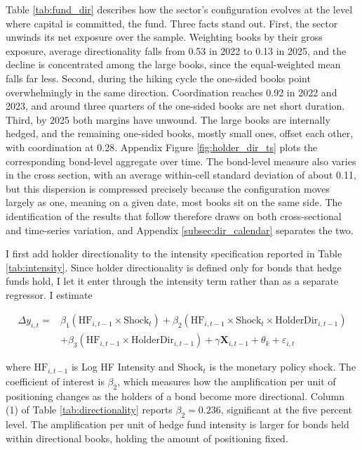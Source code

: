 \documentclass[english, 11pt, oneside]{article}
\begin{document}
Table \ref{tab:fund_dir} describes how the sector's configuration evolves at the level where capital is committed, the fund. Three facts stand out. First, the sector unwinds its net exposure over the sample. Weighting books by their gross exposure, average directionality falls from 0.53 in 2022 to 0.13 in 2025, and the decline is concentrated among the large books, since the equal-weighted mean falls far less. Second, during the hiking cycle the one-sided books point overwhelmingly in the same direction. Coordination reaches 0.92 in 2022 and 2023, and around three quarters of the one-sided books are net short duration. Third, by 2025 both margins have unwound. The large books are internally hedged, and the remaining one-sided books, mostly small ones, offset each other, with coordination at 0.28. Appendix Figure \ref{fig:holder_dir_ts} plots the corresponding bond-level aggregate over time. The bond-level measure also varies in the cross section, with an average within-cell standard deviation of about 0.11, but this dispersion is compressed precisely because the configuration moves largely as one, meaning on a given date, most books sit on the same side. The identification of the results that follow therefore draws on both cross-sectional and time-series variation, and Appendix \ref{subsec:dir_calendar} separates the two.

I first add holder directionality to the intensity specification reported in Table \ref{tab:intensity}. Since holder directionality is defined only for bonds that hedge funds hold, I let it enter through the intensity term rather than as a separate regressor. I estimate

\begin{equation}
\begin{split}
\Delta y_{i,t} = {} & \beta_1 (\text{HF}_{i,t-1} \times \text{Shock}_{t}) + \beta_2 (\text{HF}_{i,t-1} \times \text{Shock}_{t} \times \text{HolderDir}_{i,t-1}) \\
& + \beta_3 (\text{HF}_{i,t-1} \times \text{HolderDir}_{i,t-1}) + \gamma \mathbf{X}_{i,t-1} + \theta_{k} + \varepsilon_{i,t}
\end{split}
\end{equation}

\noindent where $\text{HF}_{i,t-1}$ is Log HF Intensity and $\text{Shock}_{t}$ is the monetary policy shock. The coefficient of interest is $\beta_2$, which measures how the amplification per unit of positioning changes as the holders of a bond become more directional. Column (1) of Table \ref{tab:directionality} reports $\beta_2 = 0.236$, significant at the five percent level. The amplification per unit of hedge fund intensity is larger for bonds held within directional books, holding the amount of positioning fixed.
\end{document}
